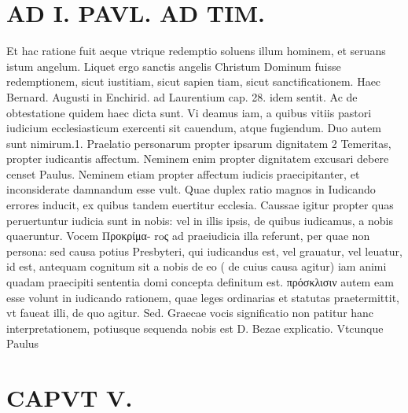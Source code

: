 \documentclass{article}
\begin{document}
\begin{pages}
\section*{AD I. PAVL. AD TIM. }
\marginpar{[ p.336 ]}\pstart Et hac ratione fuit aeque vtrique redemptio soluens illum hominem, et seruans istum angelum. Liquet ergo sanctis angelis Christum Dominum fuisse redemptionem, sicut iustitiam, sicut sapien tiam, sicut sanctificationem. Haec Bernard. Augusti in Enchirid. ad Laurentium cap. 28. idem sentit. Ac de obtestatione quidem haec dicta sunt. Vi deamus iam, a quibus vitiis pastori iudicium ecclesiasticum exercenti sit cauendum, atque fugiendum. Duo autem sunt nimirum.1. Praelatio personarum propter ipsarum dignitatem 2 Temeritas, propter iudicantis affectum. Neminem enim propter dignitatem excusari debere censet Paulus. Neminem etiam propter affectum iudicis praecipitanter, et inconsiderate damnandum esse vult. Quae duplex ratio magnos in Iudicando errores inducit, ex quibus tandem euertitur ecclesia. Caussae igitur propter quas peruertuntur iudicia sunt in nobis: vel in illis ipsis, de quibus iudicamus, a nobis quaeruntur. Vocem Προκρίμα- roς ad praeiudicia illa referunt, per quae non persona: sed causa potius Presbyteri, qui iudicandus est, vel grauatur, vel leuatur, id est, antequam cognitum sit a nobis de eo ( de cuius causa agitur) iam animi quadam praecipiti sententia domi concepta definitum est. πρόσκλισιν autem eam esse volunt in iudicando rationem, quae leges ordinarias et statutas praetermittit, vt faueat illi, de quo agitur. Sed. Graecae vocis significatio non patitur hanc interpretationem, potiusque sequenda nobis est D. Bezae explicatio. Vtcunque Paulus  \pend
\section*{CAPVT  V. }
\marginpar{[ p.337 ]}\pstart {}
{}

\end{pages}
\end{document}
